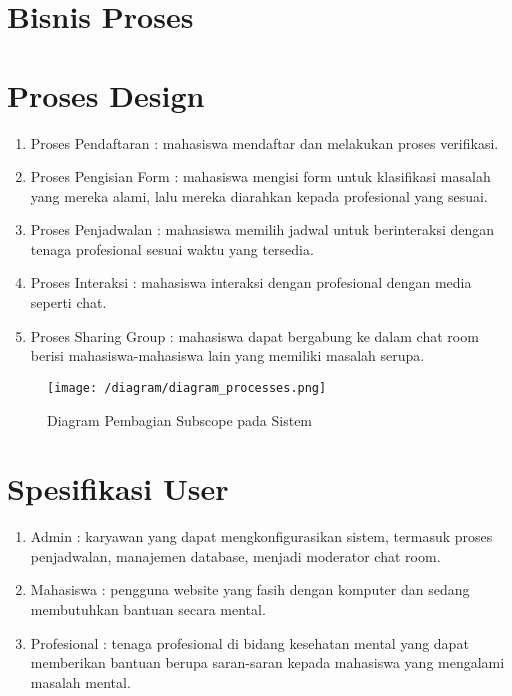 \documentclass{article}
\begin{document}
	\section{Bisnis Proses}
	
	\section{Proses Design}
	\begin{enumerate}
		\item Proses Pendaftaran : mahasiswa mendaftar dan melakukan proses verifikasi.
		\item Proses Pengisian Form : mahasiswa mengisi form untuk  klasifikasi masalah yang mereka alami, lalu mereka diarahkan kepada profesional yang sesuai.
		\item Proses Penjadwalan : mahasiswa memilih jadwal untuk berinteraksi dengan tenaga profesional sesuai waktu yang tersedia.
		\item Proses Interaksi : mahasiswa interaksi dengan profesional dengan media seperti chat.
		\item Proses Sharing Group : mahasiswa dapat bergabung ke dalam chat room berisi mahasiswa-mahasiswa lain yang memiliki masalah serupa.
	\end{enumerate}
	
	\begin{figure}[!h]
		\centering	
		\texttt{[image: /diagram/diagram\_processes.png]}
		\caption{Diagram Pembagian Subscope pada Sistem}
	\end{figure}
	\section{Spesifikasi User}
	\begin{enumerate}
		\item Admin : karyawan yang dapat mengkonfigurasikan sistem, termasuk proses penjadwalan, manajemen database, menjadi moderator chat room.
		\item Mahasiswa : pengguna website yang fasih dengan komputer dan sedang membutuhkan bantuan secara mental.
		\item Profesional : tenaga profesional di bidang kesehatan mental yang dapat memberikan bantuan berupa saran-saran kepada mahasiswa yang mengalami masalah mental.
	\end{enumerate}
	
\end{document}
